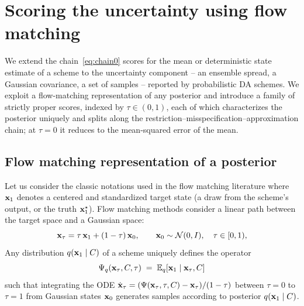 \section{Scoring the uncertainty using flow matching}\label{sec:fms}

We extend the chain~\eqref{eq:chain0} scores for the mean or deterministic state estimate of a scheme to the uncertainty component -- an ensemble spread, a Gaussian covariance, a set of samples -- reported by probabilistic DA schemes. We exploit a flow-matching representation of any posterior and introduce a family of strictly proper scores, indexed by $\tau \in (0,1)$, each of which characterizes the posterior uniquely and splits along the restriction--misspecification--approximation chain; at $\tau = 0$ it reduces to the mean-squared error of the mean.

\subsection{Flow matching representation of a posterior}

Let us consider the classic notations used in the flow matching literature \cite{lipman_flow_2023,albergo_stochastic_2025} where $\mathbf{x}_1$ denotes a centered and standardized target state (a draw from the scheme's output, or the truth $\mathbf{x}_1^\star$). Flow matching methods consider a linear path between the target space and a Gaussian space:
\begin{equation}
\label{eq:path}
  \mathbf{x}_\tau = \tau\, \mathbf{x}_1 + (1-\tau)\, \mathbf{x}_0, \qquad \mathbf{x}_0 \sim \mathcal{N}(0, I),\quad \tau \in [0, 1),
\end{equation}
Any  distribution $q(\mathbf{x}_1 \mid C)$ of a scheme uniquely defines the operator
\begin{equation}\label{eq:psi}
  \Psi_q(\mathbf{x}_\tau, C, \tau) \;=\; \mathbb{E}_q[\mathbf{x}_1 \mid \mathbf{x}_\tau, C] 
\end{equation}
such that integrating the ODE
$\dot{\mathbf{x}}_\tau = (\Psi(\mathbf{x}_\tau, \tau, C) - \mathbf{x}_\tau)/(1-\tau)$ between $\tau=0$ to $\tau=1$ from Gaussian states $\mathbf{x}_0$ generates samples according to posterior $q(\mathbf{x}_1 \mid C)$. 

